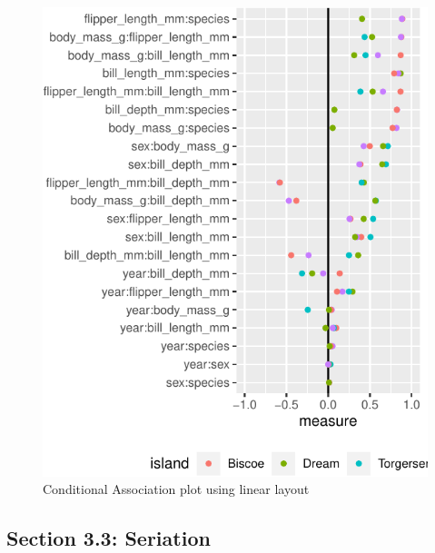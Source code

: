 \begin{Schunk}
\begin{figure}

{\centering \includegraphics{rj_paper_files/figure-latex/linear_cond_assoc-1} 

}

\caption[Conditional Association plot using linear layout]{Conditional Association plot using linear layout}\label{fig:linear_cond_assoc}
\end{figure}
\end{Schunk}

\hypertarget{section-3.3-seriation}{%
\subsection{Section 3.3: Seriation}\label{section-3.3-seriation}}



\address{%
Amit Chinwan\\
Maynooth University\\%
Hamilton Institute\\ Maynooth, Ireland\\
%
%
%
\href{mailto:amit.chinwan.2019@mumail.ie}{\nolinkurl{amit.chinwan.2019@mumail.ie}}%
}

\address{%
Catherine Hurley\\
Maynooth University\\%
Department of Mathematics and Statistics\\ Maynooth, Ireland\\
%
%
%
\href{mailto:catherine.hurley@mu.ie}{\nolinkurl{catherine.hurley@mu.ie}}%
}
